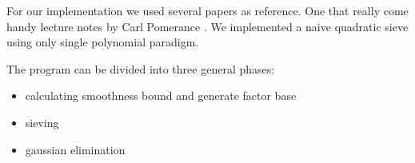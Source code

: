 
For our implementation we used several papers as reference. One that really come handy
lecture notes by Carl Pomerance \cite{Pomerance05smoothnumbers}. We implemented a naive
quadratic sieve using only single polynomial paradigm.

The program can be divided into three general phases:
\begin{itemize}
\item calculating smoothness bound and generate factor base
\item sieving
\item gaussian elimination
\end{itemize}
